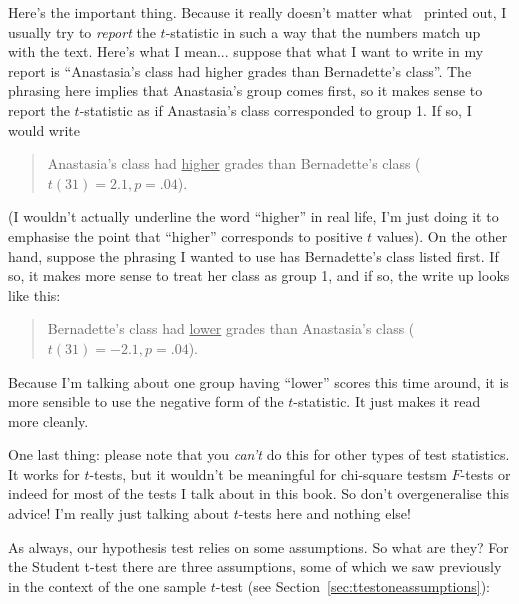Here's the important thing. Because it really doesn't matter what \R\ printed out, I usually try to {\it report} the $t$-statistic in such a way that the numbers match up with the text. Here's what I mean... suppose that what I want to write in my report is ``Anastasia's class had higher  grades than Bernadette's class''. The phrasing here implies that Anastasia's group comes first, so it makes sense to report the $t$-statistic as if Anastasia's class corresponded to group 1. If so, I would write 
\begin{quote}
Anastasia's class had \underline{higher} grades than Bernadette's class ($t(31)= 2.1, p=.04$). 
\end{quote}
(I wouldn't actually underline the word ``higher'' in real life, I'm just doing it to emphasise the point that ``higher'' corresponds to positive $t$ values). On the other hand, suppose the phrasing I wanted to use has Bernadette's class listed first. If so, it makes more sense to treat her class as group 1, and if so, the write up looks like this:
\begin{quote}
Bernadette's class had \underline{lower} grades than Anastasia's class ($t(31)= -2.1, p=.04$). 
\end{quote}
Because I'm talking about one group having ``lower'' scores this time around, it is more sensible to use the negative form of the $t$-statistic. It just makes it read more cleanly.

One last thing: please note that you {\it can't} do this for other types of test statistics. It works for $t$-tests, but it wouldn't be meaningful for  chi-square testsm $F$-tests or indeed for most of the tests I talk about in this book. So don't overgeneralise this advice! I'm really just talking about $t$-tests here and nothing else!
 
 

As always, our hypothesis test relies on some assumptions. So what are they? For the Student t-test there are three assumptions, some of which we saw previously in the context of the one sample $t$-test (see Section~\ref{sec:ttestoneassumptions}):

